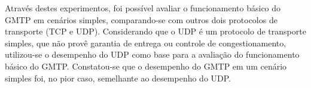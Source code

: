 Através destes experimentos, foi possível avaliar o funcionamento básico do GMTP em cenários simples, comparando-se com outros dois protocolos de transporte (TCP e UDP). 
Considerando que o UDP é um protocolo de transporte simples, que não provê garantia de entrega ou controle de congestionamento, utilizou-se o desempenho do UDP como base para a avaliação do funcionamento básico do GMTP. 
Constatou-se que o desempenho do GMTP em um cenário simples foi, no pior caso, semelhante ao desempenho do UDP. 
